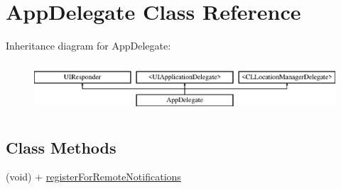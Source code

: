 \hypertarget{interface_app_delegate}{}\section{App\+Delegate Class Reference}
\label{interface_app_delegate}
Inheritance diagram for App\+Delegate\+:\begin{figure}[H]
\begin{center}
\leavevmode
\includegraphics[height=1.876047cm]{interface_app_delegate}
\end{center}
\end{figure}
\subsection*{Class Methods}
\begin{DoxyCompactItemize}
\item 
(void) + \hyperlink{interface_app_delegate_ae8f49b11e08aa179db59ab3dde6d81a5}{register\+For\+Remote\+Notifications}
\end{DoxyCompactItemize}
